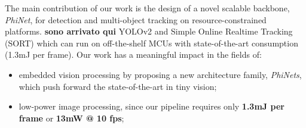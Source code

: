The main contribution of our work is the design of a novel scalable backbone, \textit{PhiNet}, for detection and multi-object tracking on resource-constrained platforms. \textbf{sono arrivato qui} YOLOv2 \cite{redmon2017yolo9000} and Simple Online Realtime Tracking (SORT) \cite{bewley2016simple} which can run on off-the-shelf MCUs with state-of-the-art consumption (1.3mJ per frame). Our work has a meaningful impact in the fields of:
\begin{itemize}
\item embedded vision processing by proposing a new architecture family, \textit{PhiNets}, which push forward the state-of-the-art in tiny vision;
\item low-power image processing, since our pipeline requires only \textbf{1.3mJ per frame} or \textbf{13mW @ 10 fps};
\end{itemize}


